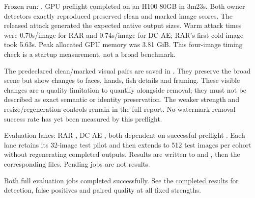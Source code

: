 Frozen run: \texttt{}. GPU preflight
\texttt{} completed on an H100 80GB in 3m23s. Both
owner detectors exactly reproduced preserved clean and marked image
scores. The released attack generated the expected native output sizes.
Warm attack times were 0.70s/image for RAR and 0.74s/image for DC-AE;
RAR's first cold image took 5.63s. Peak allocated GPU memory was 3.81
GiB. This four-image timing check is a startup measurement, not a broad
benchmark.

The predeclared clean/marked visual pairs are saved in
\texttt{}. They preserve the broad scene
but show changes to faces, hands, fish details and framing. These
visible changes are a quality limitation to quantify alongside removal;
they must not be described as exact semantic or identity preservation.
The weaker strength and resize/regeneration controls remain in the full
report. No watermark removal success rate has yet been measured by this
preflight.

Evaluation lanes: RAR \texttt{}, DC-AE
\texttt{}, both dependent on successful preflight
\texttt{}. Each lane retains its 32-image test pilot
and then extends to 512 test images per cohort without regenerating
completed outputs. Results are written to
\texttt{} and
\texttt{}, then the corresponding
\texttt{} files. Pending jobs are not results.

Both full evaluation jobs completed successfully. See the
\href{records/docs/closed_image_results.tex}{completed results} for
detection, false positives and paired quality at all fixed strengths.
